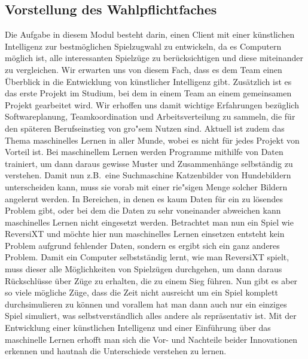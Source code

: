 \subsection{Vorstellung des Wahlpflichtfaches}\label{subsec:vorstellung-des-wahlpflichtfaches}
Die Aufgabe in diesem Modul besteht darin, einen Client mit einer k\"unstlichen Intelligenz zur bestm\"oglichen Spielzugwahl zu entwickeln, da es Computern m\"oglich ist, alle interessanten Spielz\"uge zu ber\"ucksichtigen und diese miteinander zu vergleichen.
Wir erwarten uns von diesem Fach, dass es dem Team einen \"Uberblick in die Entwicklung von k\"unstlicher Intelligenz gibt.
Zus\"atzlich ist es das erste Projekt im Studium, bei dem in einem Team an einem gemeinsamen Projekt gearbeitet wird.
Wir erhoffen uns damit wichtige Erfahrungen bez\"uglich Softwareplanung, Teamkoordination und Arbeitsverteilung zu sammeln, die f\"ur den sp\"ateren Berufseinstieg von gro"sem Nutzen sind.
Aktuell ist zudem das Thema maschinelles Lernen in aller Munde, wobei es nicht f\"ur jedes Projekt von Vorteil ist.
Bei maschinellem Lernen werden Programme mithilfe von Daten trainiert, um dann daraus gewisse Muster und Zusammenh\"ange selbst\"andig zu verstehen.
Damit nun z.B.\ eine Suchmaschine Katzenbilder von Hundebildern unterscheiden kann, muss sie vorab mit einer rie"sigen Menge solcher Bildern angelernt werden.
In Bereichen, in denen es kaum Daten f\"ur ein zu l\"osendes Problem gibt, oder bei dem die Daten zu sehr voneinander abweichen kann maschinelles Lernen nicht eingesetzt werden.
Betrachtet man nun ein Spiel wie ReversiXT und m\"ochte hier nun maschinelles Lernen einsetzen entsteht kein Problem aufgrund fehlender Daten, sondern es ergibt sich ein ganz anderes Problem.
Damit ein Computer selbstst\"andig lernt, wie man ReversiXT spielt, muss dieser alle M\"oglichkeiten von Spielz\"ugen durchgehen, um dann daraus R\"uckschl\"usse \"uber Z\"uge zu erhalten, die zu einem Sieg f\"uhren.
Nun gibt es aber so viele m\"ogliche Z\"uge, dass die Zeit nicht ausreicht um ein Spiel komplett durchsimulieren zu k\"onnen und vorallem hat man dann auch nur ein einziges Spiel simuliert, was selbstverst\"andlich alles andere als repr\"asentativ ist.
Mit der Entwicklung einer k\"unstlichen Intelligenz und einer Einf\"uhrung \"uber das maschinelle Lernen erhofft man sich die Vor- und Nachteile beider Innovationen erkennen und hautnah die Unterschiede verstehen zu lernen.


\bigskip
\newpage